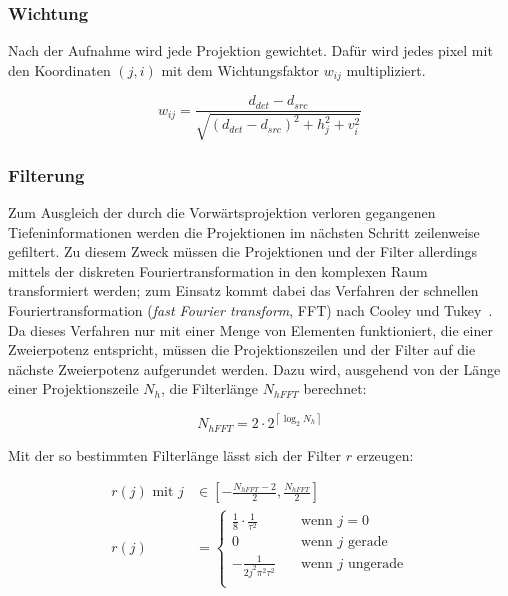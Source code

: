 \subsubsection{Wichtung}\label{sssec:fdk_wichtung}

Nach der Aufnahme wird jede Projektion gewichtet. Dafür wird jedes \gls{pixel} mit den Koordinaten $(j, i)$ mit dem
Wichtungsfaktor $w_{ij}$ multipliziert.

\begin{equation}\label{eq:wichtung}
    w_{ij} = \frac{d_{det} - d_{src}}{\sqrt{(d_{det} - d_{src})^2 + h_j^2 + v_i^2}}
\end{equation}

\subsubsection{Filterung}\label{sssec:fdk_filter}

Zum Ausgleich der durch die Vorwärtsprojektion verloren gegangenen Tiefeninformationen werden die Projektionen im
nächsten Schritt zeilenweise gefiltert. Zu diesem Zweck müssen die Projektionen und der Filter allerdings mittels der
diskreten Fouriertransformation in den komplexen Raum transformiert werden; zum Einsatz kommt dabei das Verfahren der
schnellen Fouriertransformation (\textit{fast Fourier transform}, FFT) nach Cooley und Tukey~\cite{cooltuk}. Da dieses
Verfahren nur mit einer Menge von Elementen funktioniert, die einer Zweierpotenz entspricht, müssen die
Projektionszeilen und der Filter auf die nächste Zweierpotenz {\glqq}aufgerundet{\grqq} werden. Dazu wird, ausgehend von
der Länge einer Projektionszeile $N_h$,  die Filterlänge $N_{hFFT}$ berechnet:

\begin{equation}
    N_{hFFT} = 2 \cdot 2^{\left\lceil \log_{2} N_h \right\rceil}
\end{equation}

Mit der so bestimmten Filterlänge lässt sich der Filter $r$ erzeugen:

\begin{equation}\label{eq:filter_gen}
    \begin{aligned}
        r(j) \text{ mit } j &\in \left[-\frac{N_{hFFT} - 2}{2}, \frac{N_{hFFT}}{2}\right]\\
        r(j) &=
            \begin{cases}
                \frac{1}{8} \cdot \frac{1}{\tau^2} & \quad \text{wenn } j = 0\\
                0 & \quad \text{wenn } j \text{ gerade}\\
                -\frac{1}{2j^2\pi^2\tau^2} & \quad \text{wenn } j \text{ ungerade}\\
            \end{cases}
    \end{aligned}
\end{equation}

